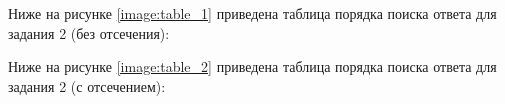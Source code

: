 Ниже на рисунке \ref{image:table_1} приведена таблица порядка поиска ответа для задания 2 (без отсечения):
\begin{figure}[H]
\end{figure}
Ниже на рисунке \ref{image:table_2} приведена таблица порядка поиска ответа для задания 2 (с отсечением):
\begin{figure}[H]
\end{figure}